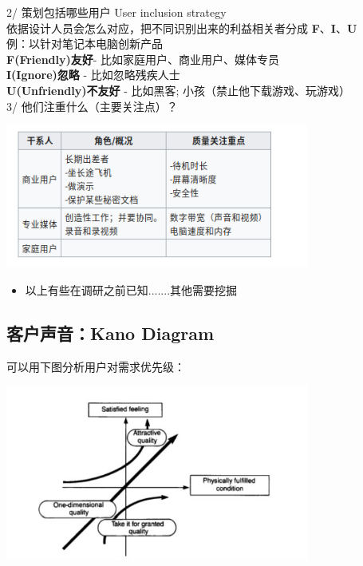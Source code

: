 2/ 策划包括哪些用户 User inclusion strategy \\
依据设计人员会怎么对应，把不同识别出来的利益相关者分成
\textbf{F}、\textbf{I}、\textbf{U}\\
例：以针对笔记本电脑创新产品\\
\textbf{F(Friendly)友好}- 比如家庭用户、商业用户、媒体专员\\
\textbf{I(Ignore)忽略} - 比如忽略残疾人士\\
\textbf{U(Unfriendly)不友好} - 比如黑客;
小孩（禁止他下载游戏、玩游戏）\\
3/ 他们注重什么（主要关注点）？


\includegraphics[width=10cm]{Screenshotfrom2023-03-2701-17-51.png}

\begin{itemize}
\tightlist
\item
  以上有些在调研之前已知.......其他需要挖掘
\end{itemize}

\hypertarget{ux5ba2ux6237ux58f0ux97f3kano-diagram}{%
\subsection{客户声音：Kano
Diagram}\label{ux5ba2ux6237ux58f0ux97f3kano-diagram}}

可以用下图分析用户对需求优先级：


\includegraphics[width=10cm]{IcKanoDiagramScreenshot_2022-12-17_120845.jpg}

